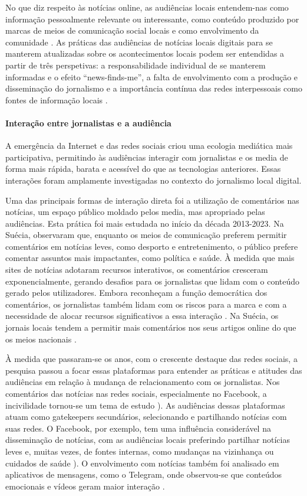 \documentclass[portuguese]{textolivre}
\begin{document}
No que diz respeito às notícias online, as audiências locais entendem-nas como informação pessoalmente relevante ou interessante, como conteúdo produzido por marcas de meios de comunicação social locais e como envolvimento da comunidade \cite{guyas2019}. As práticas das audiências de notícias locais digitais para se manterem atualizadas sobre os acontecimentos locais podem ser entendidas a partir de três perspetivas: a responsabilidade individual de se manterem informadas e o efeito “news-finds-me”, a falta de envolvimento com a produção e disseminação do jornalismo e a importância contínua das redes interpessoais como fontes de informação locais  \cite{mccollough2017}. 

\paragraph{Interação entre jornalistas e a audiência}
A emergência da Internet e das redes sociais criou uma ecologia mediática mais participativa, permitindo às audiências interagir com jornalistas e os media de forma mais rápida, barata e acessível do que as tecnologias anteriores. Essas interações foram amplamente investigadas no contexto do jornalismo local digital.

Uma das principais formas de interação direta foi a utilização de comentários nas notícias, um espaço público moldado pelos media, mas apropriado pelas audiências. Esta prática foi mais estudada no início da década 2013-2023. Na Suécia, \textcite{almgren2015} observaram que, enquanto os meios de comunicação preferem permitir comentários em notícias leves, como desporto e entretenimento, o público prefere comentar assuntos mais impactantes, como política e saúde. À medida que mais sites de notícias adotaram recursos interativos, os comentários cresceram exponencialmente, gerando desafios para os jornalistas que lidam com o conteúdo gerado pelos utilizadores. Embora reconheçam a função democrática dos comentários, os jornalistas também lidam com os riscos para a marca e com a necessidade de alocar recursos significativos a essa interação \cite{canter2013}. Na Suécia, os jornais locais tendem a permitir mais comentários nos seus artigos online do que os meios nacionais \cite{almgren2016}.

À medida que passaram-se os anos, com o crescente destaque das redes sociais, a pesquisa passou a focar essas plataformas para entender as práticas e atitudes das audiências em relação à mudança de relacionamento com os jornalistas. Nos comentários das notícias nas redes sociais, especialmente no Facebook, a incivilidade tornou-se um tema de estudo \cite{kim2023}). As audiências dessas plataformas atuam como gatekeepers secundários, selecionando e partilhando notícias com suas redes. O Facebook, por exemplo, tem uma influência considerável na disseminação de notícias, com as audiências locais preferindo partilhar notícias leves e, muitas vezes, de fontes internas, como mudanças na vizinhança ou cuidados de saúde \cite{almgren2017}). O envolvimento com notícias também foi analisado em aplicativos de mensagens, como o Telegram, onde observou-se que conteúdos emocionais e vídeos geram maior interação \cite{hradziushka2023}.
\end{document}
